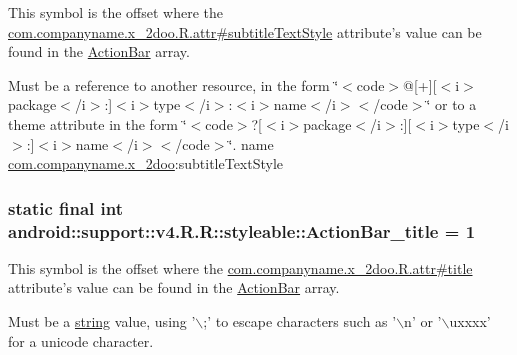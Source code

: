 This symbol is the offset where the \hyperlink{classcom_1_1companyname_1_1x__2doo_1_1_r_1_1attr_19f2a7fd83211aa9b099862a6f8def04}{com.companyname.x\_\-2doo.R.attr\#subtitleTextStyle} attribute's value can be found in the \hyperlink{classandroid_1_1support_1_1v4_1_1_r_1_1styleable_5c6cf2c83551ebae05f365bb913fdddf}{ActionBar} array.

Must be a reference to another resource, in the form \char`\"{}$<$code$>$@\mbox{[}+\mbox{]}\mbox{[}$<$i$>$package$<$/i$>$:\mbox{]}$<$i$>$type$<$/i$>$:$<$i$>$name$<$/i$>$$<$/code$>$\char`\"{} or to a theme attribute in the form \char`\"{}$<$code$>$?\mbox{[}$<$i$>$package$<$/i$>$:\mbox{]}\mbox{[}$<$i$>$type$<$/i$>$:\mbox{]}$<$i$>$name$<$/i$>$$<$/code$>$\char`\"{}.  name \hyperlink{namespacecom_1_1companyname_1_1x__2doo}{com.companyname.x\_\-2doo}:subtitleTextStyle \hypertarget{classandroid_1_1support_1_1v4_1_1_r_1_1styleable_71731b8a49f4eb22e29277c675a98927}{
\subsubsection[{ActionBar\_\-title}]{\setlength{\rightskip}{0pt plus 5cm}static final int android::support::v4.R.R::styleable::ActionBar\_\-title = 1}}
\label{classandroid_1_1support_1_1v4_1_1_r_1_1styleable_71731b8a49f4eb22e29277c675a98927}


This symbol is the offset where the \hyperlink{classcom_1_1companyname_1_1x__2doo_1_1_r_1_1attr_d23b9d3aaa28f1e83be97e20f187059b}{com.companyname.x\_\-2doo.R.attr\#title} attribute's value can be found in the \hyperlink{classandroid_1_1support_1_1v4_1_1_r_1_1styleable_5c6cf2c83551ebae05f365bb913fdddf}{ActionBar} array.

Must be a \hyperlink{classandroid_1_1support_1_1v4_1_1_r_1_1string}{string} value, using '$\backslash$;' to escape characters such as '$\backslash$n' or '$\backslash$uxxxx' for a unicode character. 

